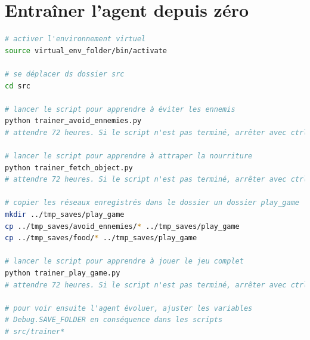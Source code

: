 \documentclass[11pt,a4paper]{report}
\begin{document}
\section{Entraîner l'agent depuis zéro}
\begin{lstlisting}[language=bash]
# activer l'environnement virtuel
source virtual_env_folder/bin/activate

# se déplacer ds dossier src
cd src 

# lancer le script pour apprendre à éviter les ennemis
python trainer_avoid_ennemies.py
# attendre 72 heures. Si le script n'est pas terminé, arrêter avec ctrl+c

# lancer le script pour apprendre à attraper la nourriture
python trainer_fetch_object.py
# attendre 72 heures. Si le script n'est pas terminé, arrêter avec ctrl+c

# copier les réseaux enregistrés dans le dossier un dossier play_game
mkdir ../tmp_saves/play_game
cp ../tmp_saves/avoid_ennemies/* ../tmp_saves/play_game
cp ../tmp_saves/food/* ../tmp_saves/play_game

# lancer le script pour apprendre à jouer le jeu complet
python trainer_play_game.py
# attendre 72 heures. Si le script n'est pas terminé, arrêter avec ctrl+c

# pour voir ensuite l'agent évoluer, ajuster les variables 
# Debug.SAVE_FOLDER en conséquence dans les scripts
# src/trainer*

  \end{lstlisting}  
\end{document}
